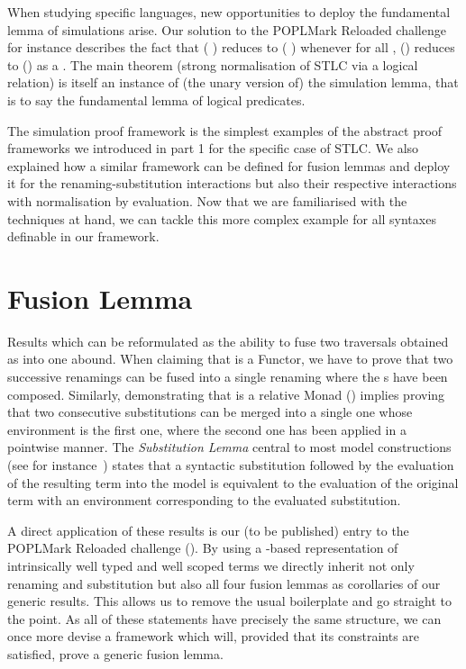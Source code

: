 When studying specific languages, new opportunities to deploy the
fundamental lemma of simulations arise. Our solution to the POPLMark
Reloaded challenge for instance describes the fact that ({  })
reduces to ({  }) whenever for all ,
() reduces to () as a .
The main theorem (strong normalisation of STLC via a logical relation)
is itself an instance of (the unary version of) the simulation lemma,
that is to say the fundamental lemma of logical predicates.

The simulation proof framework is the simplest examples of the abstract
proof frameworks we introduced in part 1 for the specific case of STLC.
We also explained how a similar framework can be defined
for fusion lemmas and deploy it for the renaming-substitution interactions
but also their respective interactions with normalisation by evaluation.
Now that we are familiarised with the techniques at hand, we can tackle
this more complex example for all syntaxes definable in our framework.

\section{Fusion Lemma}\label{section:fusion}

Results which can be reformulated as the ability to fuse two traversals
obtained as  into one abound. When claiming that  is
a Functor, we have to prove that two successive renamings can be fused into
a single renaming where the s have been composed. Similarly,
demonstrating that  is a relative Monad (\cite{JFR4389}) implies proving
that two consecutive substitutions can be merged into a single one whose
environment is the first one, where the second one has been applied in a
pointwise manner. The \emph{Substitution Lemma} central
to most model constructions (see for instance~\cite{mitchell1991kripke}) states
that a syntactic substitution followed by the evaluation of the resulting term
into the model is equivalent to the evaluation of the original term with an
environment corresponding to the evaluated substitution.

A direct application of these results is our (to be published) entry to the
POPLMark Reloaded challenge (\citeyear{poplmarkreloaded}). By using a -based
representation of intrinsically well typed and well scoped terms we directly inherit
not only renaming and substitution but also all four fusion lemmas as corollaries
of our generic results. This allows us to remove the usual boilerplate
and go straight to the point.
As all of these statements have precisely the same structure, we can
once more devise a framework which will, provided that its constraints are
satisfied, prove a generic fusion lemma.

